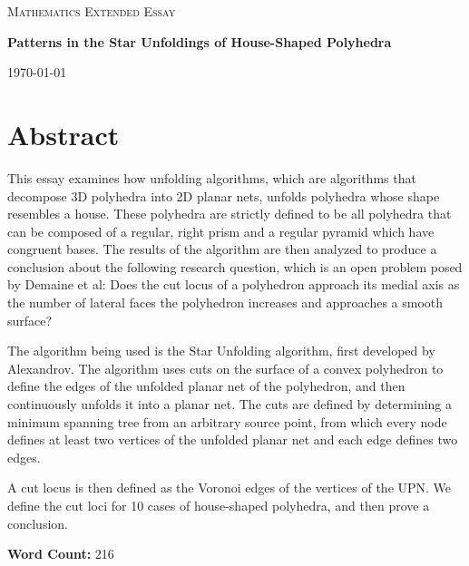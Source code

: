 \documentclass[12 pt]{article}
\begin{document}
\begin{titlepage}
\centering

	\vspace{1cm}
	{\scshape\Large Mathematics Extended Essay\par}
	\vspace{3cm}
	{\huge\bfseries Patterns in the Star Unfoldings of House-Shaped Polyhedra\par}
	\vfill

	{\large \today\par}
\end{titlepage}
\tableofcontents

\newpage
\graphicspath{ {Images/} }

\section*{Abstract}

This essay examines how unfolding algorithms, which are algorithms that decompose 3D polyhedra into 2D planar nets, unfolds polyhedra whose shape resembles a house. These polyhedra are strictly defined to be all polyhedra that can be composed of a regular, right prism and a regular pyramid which have congruent bases. The results of the algorithm are then analyzed to produce a conclusion about the following research question, which is an open problem posed by Demaine et al: Does the cut locus of a polyhedron approach its medial axis as the number of lateral faces the polyhedron increases and approaches a smooth surface?

The algorithm being used is the Star Unfolding algorithm, first developed by Alexandrov. The algorithm uses cuts on the surface of a convex polyhedron to define the edges of the unfolded planar net of the polyhedron, and then continuously unfolds it into a planar net. The cuts are defined by determining a minimum spanning tree from an arbitrary source point, from which every node defines at least two vertices of the unfolded planar net and each edge defines two edges. 

A cut locus is then defined as the Voronoi edges of the vertices of the UPN. We define the cut loci for 10 cases of house-shaped polyhedra, and then prove a conclusion.

\textbf{Word Count:} 216

\newpage

\end{document}
